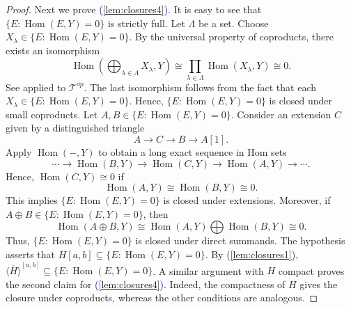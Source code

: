 \documentclass[11pt]{amsart}
\def\eqref#1{\textcolor{darkblue}{(\ref{#1})}}
\theoremstyle{plain}
\theoremstyle{definition}
\numberwithin{equation}{section}
\numberwithin{theorem}{section}
\begin{document}
\begin{proof}
    Next we prove \eqref{lem:closures4}. 
    It is easy to see that $\{E : \operatorname{Hom}(E,Y)=0\}$ is strictly full. 
    Let $\Lambda$ be a set. 
    Choose $X_\lambda \in \{E : \operatorname{Hom}(E,Y)=0\}$.
    By the universal property of coproducts, there exists an isomorphism
    \begin{displaymath}
        \operatorname{Hom}(\bigoplus_{\lambda \in \Lambda} X_\lambda, Y) 
        \cong \prod_{\lambda \in \Lambda} \operatorname{Hom}(X_\lambda, Y)
        \cong 0.
    \end{displaymath} 
    See \cite[Example 1.1.13]{Neeman:2001} applied to $\mathcal{T}^{op}$. 
    The last isomorphism follows from the fact that each $X_\lambda \in \{E : \operatorname{Hom}(E,Y)=0\}$.
    Hence, $\{E : \operatorname{Hom}(E,Y)=0\}$ is closed under small coproducts. 
    Let $A,B\in \{E : \operatorname{Hom}(E,Y)=0\}$.
    Consider an extension $C$ given by a distinguished triangle 
    \begin{displaymath}
        A \to C \to B \to A[1].
    \end{displaymath}
    Apply $\operatorname{Hom}(-,Y)$ to obtain a long exact sequence in Hom sets 
    \begin{displaymath}
        \cdots \to \operatorname{Hom}(B,Y) \to \operatorname{Hom}(C,Y) \to \operatorname{Hom}(A,Y) \to \cdots.
    \end{displaymath}
    Hence, $\operatorname{Hom}(C,Y) \cong 0$ if 
    \begin{displaymath}
        \operatorname{Hom}(A,Y) \cong \operatorname{Hom}(B,Y) \cong 0.
    \end{displaymath}
    This implies $\{E : \operatorname{Hom}(E,Y)=0\}$ is closed under extensions.
    Moreover, if $A\oplus B \in \{E : \operatorname{Hom}(E,Y)=0\}$, then 
    \begin{displaymath}
        \operatorname{Hom}(A\oplus B,Y)\cong \operatorname{Hom}(A,Y) \bigoplus \operatorname{Hom}(B,Y) \cong 0.
    \end{displaymath} 
    Thus, $\{E : \operatorname{Hom}(E,Y)=0\}$ is closed under direct summands. 
    The hypothesis asserts that $H[a,b]\subseteq \{E : \operatorname{Hom}(E,Y)=0\}$.
    By \eqref{lem:closures1}, $\overline{\langle H \rangle}^{[a,b]}\subseteq \{E : \operatorname{Hom}(E,Y)=0\}$.
    A similar argument with $H$ compact proves the second claim for \eqref{lem:closures4}.
    Indeed, the compactness of $H$ gives the closure under coproducts, whereas the other conditions are analogous.
    

\end{proof}
\end{document}
